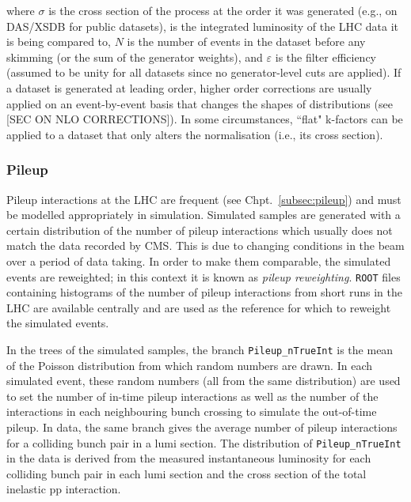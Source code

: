 where $\sigma$ is the cross section of the process at the order it was generated (e.g., on DAS/XSDB for public datasets), \intlumi is the integrated luminosity of the LHC data it is being compared to, $N$ is the number of events in the dataset before any skimming (or the sum of the generator weights), and $\varepsilon$ is the filter efficiency (assumed to be unity for all datasets since no generator-level cuts are applied). If a dataset is generated at leading order, higher order corrections are usually applied on an event-by-event basis that changes the shapes of distributions (see [SEC ON NLO CORRECTIONS]). In some circumstances, ``flat" k-factors can be applied to a dataset that only alters the normalisation (i.e., its cross section).




\subsubsection{Pileup}
\label{subsubsec:pu_reweighting}

Pileup interactions at the LHC are frequent (see Chpt.~\ref{subsec:pileup}) and must be modelled appropriately in simulation. Simulated samples are generated with a certain distribution of the number of pileup interactions which usually does not match the data recorded by CMS. This is due to changing conditions in the beam over a period of data taking. In order to make them comparable, the simulated events are reweighted; in this context it is known as \emph{pileup reweighting}. \texttt{ROOT} files containing histograms of the number of pileup interactions from short runs in the LHC are available centrally and are used as the reference for which to reweight the simulated events.

In the trees of the simulated samples, the branch \texttt{Pileup\_nTrueInt} is the mean of the Poisson distribution from which random numbers are drawn. In each simulated event, these random numbers (all from the same distribution) are used to set the number of in-time pileup interactions as well as the number of the interactions in each neighbouring bunch crossing to simulate the out-of-time pileup. In data, the same branch gives the average number of pileup interactions for a colliding bunch pair in a lumi section. The distribution of \texttt{Pileup\_nTrueInt} in the data is derived from the measured instantaneous luminosity for each colliding bunch pair in each lumi section and the cross section of the total inelastic pp interaction.

